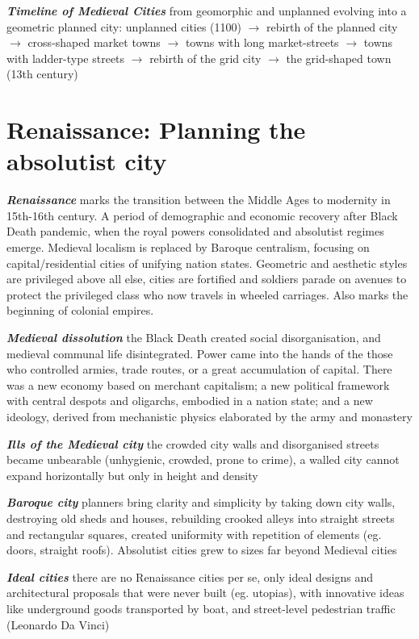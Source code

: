 \documentclass{article}
\newcommand{\bisection}[1]{\textbf{\textit{#1}}}
\begin{document}
\bisection{Timeline of Medieval Cities} from geomorphic and unplanned evolving into a geometric planned city: unplanned cities (1100) $\rightarrow$ rebirth of the planned city $\rightarrow$ cross-shaped market towns $\rightarrow$ towns with long market-streets $\rightarrow$ towns with ladder-type streets $\rightarrow$ rebirth of the grid city $\rightarrow$ the grid-shaped town (13th century)

\pagebreak
\section{Renaissance: Planning the absolutist city}

\bisection{Renaissance} marks the transition between the Middle Ages to modernity in 15th-16th century. A period of demographic and economic recovery after Black Death pandemic, when the royal powers consolidated and absolutist regimes emerge. Medieval localism is replaced by Baroque centralism, focusing on capital/residential cities of unifying nation states. Geometric and aesthetic styles are privileged above all else, cities are fortified and soldiers parade on avenues to protect the privileged class who now travels in wheeled carriages. Also marks the beginning of colonial empires.

\bisection{Medieval dissolution} the Black Death created social disorganisation, and medieval communal life disintegrated. Power came into the hands of the those who controlled armies, trade routes, or a great accumulation of capital. There was a new economy based on merchant capitalism; a new political framework with central despots and oligarchs, embodied in a nation state; and a new ideology, derived from mechanistic physics elaborated by the army and monastery

\bisection{Ills of the Medieval city} the crowded city walls and disorganised streets became unbearable (unhygienic, crowded, prone to crime), a walled city cannot expand horizontally but only in height and density

\bisection{Baroque city} planners bring clarity and simplicity by taking down city walls, destroying old sheds and houses, rebuilding crooked alleys into straight streets and rectangular squares, created uniformity with repetition of elements (eg. doors, straight roofs). Absolutist cities grew to sizes far beyond Medieval cities

\bisection{Ideal cities} there are no Renaissance cities per se, only ideal designs and architectural proposals that were never built (eg. utopias), with innovative ideas like underground goods transported by boat, and street-level pedestrian traffic (Leonardo Da Vinci)
\end{document}
